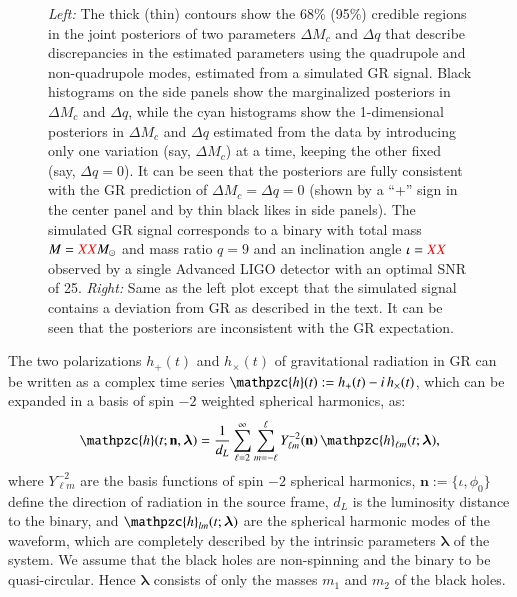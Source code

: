 \documentclass[prl,preprintnumbers,twocolumn,eqsecnum,floatfix,a4paper,nofootinbib,superscriptaddress]{revtex4}
\newcommand{\red}[1]{\textcolor{red}{#1}}
\newcommand{\h}{\mathpzc{h}}
\newcommand{\hlm}{\mathpzc{h}_{\ell m}}
\newcommand{\Ylm}{{Y}^{-2}_{\ell m}}
\newcommand{\blambda}{\bm{\lambda}}
\newcommand{\n}{\mathbf{n}}
\begin{document}
\begin{figure}[htb]
\begin{center}
\caption{\emph{Left:} The thick (thin) contours show the 68\% (95\%) credible regions in the joint posteriors of two parameters $\Delta M_c$ and $\Delta q$ that describe discrepancies in the estimated parameters using the quadrupole and non-quadrupole modes, estimated from a simulated GR signal. Black histograms on the side panels show the marginalized posteriors in $\Delta M_c$ and $\Delta q$, while the cyan histograms show the 1-dimensional posteriors in $\Delta M_c$ and $\Delta q$ estimated from the data by introducing only one variation (say, $\Delta M_c$) at a time, keeping the other fixed (say, $\Delta q = 0$). It can be seen that the posteriors are fully consistent with the GR prediction of $\Delta M_c = \Delta q = 0$ (shown by a ``+'' sign in the center panel and by thin black likes in side panels).  The simulated GR signal corresponds to a binary with total mass $M = \red{XX}M_\odot$ and mass ratio $q = 9$ and an inclination angle $\iota = \red{XX}$ observed by a single Advanced LIGO detector with an optimal SNR of 25. \emph{Right:} Same as the left plot except that the simulated signal contains a deviation from GR as described in the text. It can be seen that the posteriors are inconsistent with the GR expectation.}
\label{fig:contour_plots}
\end{center} \end{figure}

The two polarizations $h_+(t)$ and $h_\times(t)$ of gravitational radiation in GR can be written as a complex time series $\h(t) := h_+(t) - i \, h_\times(t)$, which can be expanded in a basis of spin $-2$ weighted spherical harmonics, as:
\begin{equation}
\h(t; \n, \blambda) =  \frac{1}{d_L} \sum _{\ell=2}^{\infty} \sum _{m=-\ell}^{\ell} \Ylm (\n) \, {{\hlm}(t; \blambda)}, 
\label{eq:spherical_harmonics}
\end{equation}
where $\Ylm$ are the basis functions of spin $-2$ spherical harmonics, $\n := \{\iota, \phi_0\}$ define the direction of radiation in the source frame, $d_L$ is  the luminosity distance to the binary, and ${\h}_{lm}(t; \blambda)$ are the spherical harmonic modes of the waveform, which are completely described by the intrinsic parameters $\blambda$ of the system. We assume that the black holes are non-spinning and the binary to be quasi-circular. Hence $\blambda$ consists of only the masses $m_1$ and $m_2$ of the black holes. 
\end{document}
